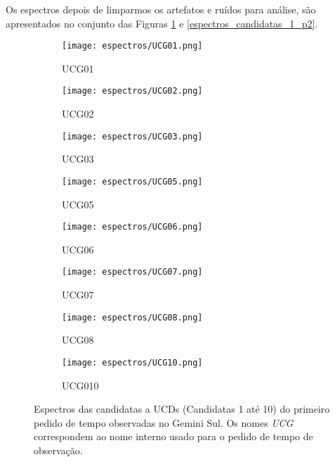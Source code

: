 Os espectros depois de limparmos os artefatos e ruídos para análise, são apresentados no conjunto das Figuras \ref{espectros_candidatas_1_p1} e \ref{espectros_candidatas_1_p2}.

\begin{figure}[H]
    \centering
    \captionsetup{justification=centering}
    \begin{subfigure}[b]{0.45\textwidth}
        \texttt{[image: espectros/UCG01.png]}
        \caption{UCG01}
    \end{subfigure}
    \begin{subfigure}[b]{0.45\textwidth}
        \texttt{[image: espectros/UCG02.png]}
        \caption{UCG02}
    \end{subfigure}
    \begin{subfigure}[b]{0.45\textwidth}
        \texttt{[image: espectros/UCG03.png]}
        \caption{UCG03}
    \end{subfigure}
    \begin{subfigure}[b]{0.45\textwidth}
        \texttt{[image: espectros/UCG05.png]}
        \caption{UCG05}
    \end{subfigure}
    \begin{subfigure}[b]{0.45\textwidth}
        \texttt{[image: espectros/UCG06.png]}
        \caption{UCG06}
    \end{subfigure}
    \begin{subfigure}[b]{0.45\textwidth}
        \texttt{[image: espectros/UCG07.png]}
        \caption{UCG07}
    \end{subfigure}
    \begin{subfigure}[b]{0.45\textwidth}
        \texttt{[image: espectros/UCG08.png]}
        \caption{UCG08}
    \end{subfigure}
    \begin{subfigure}[b]{0.45\textwidth}
        \texttt{[image: espectros/UCG10.png]}
        \caption{UCG010}
    \end{subfigure}
    \caption{Espectros das candidatas a UCDs (Candidatas 1 até 10) do primeiro pedido de tempo observadas no Gemini Sul. Os nomes \textit{UCG} correspondem ao nome interno usado para o pedido de tempo de observação.}
    \label{espectros_candidatas_1_p1}
\end{figure}


